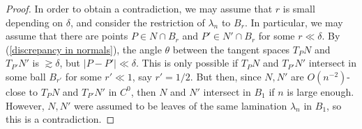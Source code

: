 \documentclass[reqno,11pt]{amsart}
\theoremstyle{definition}
\numberwithin{equation}{section}
\begin{document}
\begin{proof}
	In order to obtain a contradiction, we may assume that $r$ is small depending on $\delta$, and consider the restriction of $\lambda_n$ to $B_r$.
	In particular, we may assume that there are points $P \in N \cap B_r$ and $P' \in N' \cap B_r$ for some $r \ll \delta$.
	By (\ref{discrepancy in normals}), the angle $\theta$ between the tangent spaces $T_P N$ and $T_{P'} N'$ is $\gtrsim \delta$, but $|P - P'| \ll \delta$.
	This is only possible if $T_P N$ and $T_{P'} N'$ intersect in some ball $B_{r'}$ for some $r' \ll 1$, say $r' = 1/2$.
	But then, since $N, N'$ are $O(n^{-2})$-close to $T_P N$ and $T_{P'} N'$ in $C^0$, then $N$ and $N'$ intersect in $B_1$ if $n$ is large enough.
	However, $N, N'$ were assumed to be leaves of the same lamination $\lambda_n$ in $B_1$, so this is a contradiction.
\end{proof}
\end{document}
